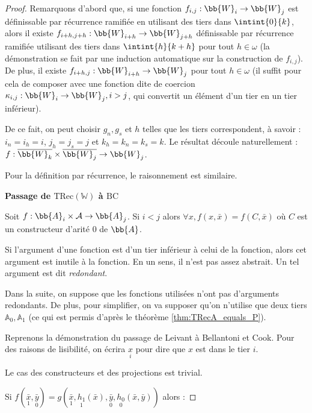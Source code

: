 \documentclass{report}
\newcommand{\bbA}{\mathbb{A}}
\newcommand{\TRec}[1]{\text{TRec}\left(\mathbb{#1}\right)}
\begin{document}
\begin{proof}
				Remarquons d'abord que, si une fonction $f_{i,j} : \bb{W}_i \to \bb{W}_j$ est définissable par récurrence ramifiée en utilisant des tiers dans $\intint{0}{k}$, alors il existe $f_{i+h, j+h} : \bb{W}_{i+h} \to \bb{W}_{j+h}$ définissable par récurrence ramifiée utilisant des tiers dans $\intint{h}{k+h}$ pour tout $h \in \omega$ (la démonstration se fait par une induction automatique sur la construction de $f_{i,j}$). De plus, il existe $f_{i+h,j} : \bb{W}_{i+h} \to \bb{W}_j$ pour tout $h \in \omega$ (il suffit pour cela de composer avec une fonction dite de coercion $\kappa_{i,j} : \bb{W}_i \to \bb{W}_j, i>j$, qui convertit un élément d'un tier en un tier inférieur).
				
				De ce fait, on peut choisir $g_n, g_s$ et $h$ telles que les tiers correspondent, à savoir : $i_n = i_h = i$, $j_h = j_s = j$ et $k_h = k_n = k_s = k$. Le résultat découle naturellement : $f : \overline{\bb{W}_{k}} \times \overline{\bb{W}_{j}} \to \bb{W}_{j}$.
				
				Pour la définition par récurrence, le raisonnement est similaire. 
				
				\espace
				
				\textbf{Passage de $\TRec{W}$ à $\text{BC}$}
				
				\begin{lemma}
					\label{lem:arg_redondant}
					Soit $f : \bb{A}_i \times \mathcal{A} \to \bb{A}_j$. Si $i < j$ alors $\forall x, f(x, \bar{x}) = f(C, \bar{x})$ où $C$ est un constructeur d'arité $0$ de $\bb{A}$.
				\end{lemma}
				
				Si l'argument d'une fonction est d'un tier inférieur à celui de la fonction, alors cet argument est inutile à la fonction. En un sens, il n'est pas assez abstrait. Un tel argument est dit \emph{redondant}.
				
				Dans la suite, on suppose que les fonctions utilisées n'ont pas d'arguments redondants. De plus, pour simplifier, on va supposer qu'on n'utilise que deux tiers $\bbA_0, \bbA_1$ (ce qui est permis d'après le théorème \ref{thm:TRecA_equals_P}).
				
				Reprenons la démonstration du passage de Leivant à Bellantoni et Cook. Pour des raisons de lisibilité, on écrira $\underset{i}{x}$ pour dire que $x$ est dans le tier $i$.
				
				Le cas des constructeurs et des projections est trivial.
				
				Si $f(\underset{1}{\bar{x}}, \underset{0}{\bar{y}}) = g( \underset{1}{\bar{x}}, \underset{1}{h_1}(\bar{x}), \underset{0}{\bar{y}}, \underset{0}{h_0}(\bar{x}, \bar{y}))$ alors :
				

\end{proof}
\end{document}
